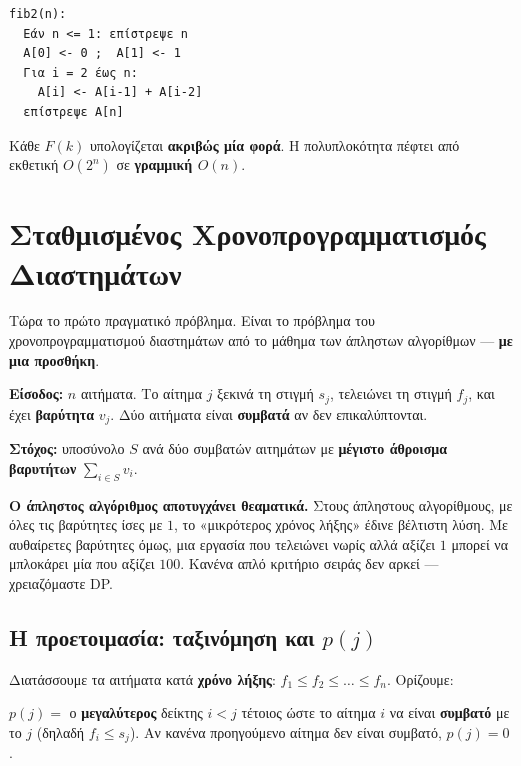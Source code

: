 \documentclass[11pt,a4paper]{article}
\begin{document}
\begin{codebox}
\begin{verbatim}
fib2(n):
  Εάν n <= 1: επίστρεψε n
  A[0] <- 0 ;  A[1] <- 1
  Για i = 2 έως n:
    A[i] <- A[i-1] + A[i-2]
  επίστρεψε A[n]
\end{verbatim}
\end{codebox}

Κάθε $F(k)$ υπολογίζεται \textbf{ακριβώς μία φορά}. Η πολυπλοκότητα πέφτει από
εκθετική $O(2^n)$ σε \textbf{γραμμική $O(n)$}.

\section{Σταθμισμένος Χρονοπρογραμματισμός Διαστημάτων}

Τώρα το πρώτο πραγματικό πρόβλημα. Είναι το πρόβλημα του χρονοπρογραμματισμού
διαστημάτων από το μάθημα των άπληστων αλγορίθμων --- \textbf{με μια προσθήκη}.

\textbf{Είσοδος:} $n$ αιτήματα. Το αίτημα $j$ ξεκινά τη στιγμή $s_j$, τελειώνει
τη στιγμή $f_j$, και έχει \textbf{βαρύτητα} $v_j$. Δύο αιτήματα είναι
\textbf{συμβατά} αν δεν επικαλύπτονται.

\textbf{Στόχος:} υποσύνολο $S$ ανά δύο συμβατών αιτημάτων με \textbf{μέγιστο
άθροισμα βαρυτήτων} $\sum_{i \in S} v_i$.

\begin{warningbox}
\textbf{Ο άπληστος αλγόριθμος αποτυγχάνει θεαματικά.} Στους άπληστους
αλγορίθμους, με όλες τις βαρύτητες ίσες με $1$, το «μικρότερος χρόνος λήξης»
έδινε βέλτιστη λύση. Με αυθαίρετες βαρύτητες όμως, μια εργασία που τελειώνει
νωρίς αλλά αξίζει $1$ μπορεί να μπλοκάρει μία που αξίζει $100$. Κανένα απλό
κριτήριο σειράς δεν αρκεί --- χρειαζόμαστε DP.
\end{warningbox}

\subsection{Η προετοιμασία: ταξινόμηση και $p(j)$}

Διατάσσουμε τα αιτήματα κατά \textbf{χρόνο λήξης}:
$f_1 \le f_2 \le \dots \le f_n$. Ορίζουμε:

\begin{keypoint}
$p(j) = $ ο \textbf{μεγαλύτερος} δείκτης $i < j$ τέτοιος ώστε το αίτημα $i$ να
είναι \textbf{συμβατό} με το $j$ (δηλαδή $f_i \le s_j$). Αν κανένα προηγούμενο
αίτημα δεν είναι συμβατό, $p(j) = 0$.
\end{keypoint}
\end{document}
